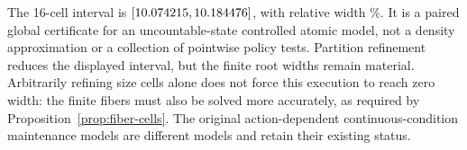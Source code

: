 The 16-cell interval is $[10.074215,10.184476]$, with relative width \RFiberRelative\%. It is a paired global certificate for an uncountable-state controlled atomic model, not a density approximation or a collection of pointwise policy tests. Partition refinement reduces the displayed interval, but the finite root widths remain material. Arbitrarily refining size cells alone does not force this execution to reach zero width: the finite fibers must also be solved more accurately, as required by Proposition~\ref{prop:fiber-cells}. The original action-dependent continuous-condition maintenance models are different models and retain their existing status.
